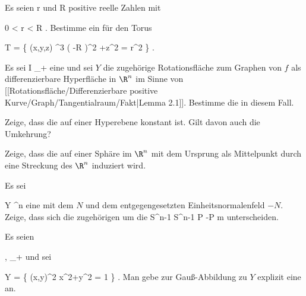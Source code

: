 {}
{

Es seien
\mathkor {} {r} {und} {R} {}
positive reelle Zahlen mit

\mavergleichskette
{\vergleichskette
{ 0
}
{ < }{ r
}
{ < }{ R
}
{    }{
}
{   }{
}
}
{}{}{.}
Bestimme ein
für den
 {} {}
Torus

\mavergleichskettedisp
{\vergleichskette
{ T
}
{ =} { \left\{ (x,y,z) \in \R^3  \mid   \left(   -R  \right)^2 +z^2  = r^2         \right\}
}
{ } {
}
{ } {
}
{ } {
}
}
{}{}{.}

}
{} {}

{}
{

Es sei
 { I } {\R_+
} {}
eine
und sei $Y$ die zugehörige Rotationsfläche zum Graphen von $f$ als differenzierbare Hyperfläche in $\R^n$ im Sinne von
[[Rotationsfläche/Differenzierbare positive Kurve/Graph/Tangentialraum/Fakt|Lemma 2.1]].
Bestimme die
in diesem Fall.

}
{} {}

{}
{

Zeige, dass die
auf einer Hyperebene konstant ist. Gilt davon auch die Umkehrung?

}
{} {}

{}
{

Zeige, dass die
auf einer Sphäre im $\R^n$ mit dem Ursprung als Mittelpunkt durch eine Streckung des $\R^n$ induziert wird.

}
{} {}

{}
{

Es sei

\mavergleichskette
{\vergleichskette
{ Y
}
{ \subseteq }{ \R^n
}
{  }{
}
{    }{
}
{   }{
}
}
{}{}{}
eine
mit dem
$N$ und dem entgegengesetzten Einheitsnormalenfeld $-N$. Zeige, dass sich die zugehörigen
um die
\maabbeledisp {} {S^{n-1}} {S^{n-1}
} { P } { -P
} {m}
unterscheiden.

}
{} {}

{}
{

Es seien

\mavergleichskette
{\vergleichskette
{ \alpha,\beta
}
{ \in }{ \R_+
}
{  }{
}
{    }{
}
{   }{
}
}
{}{}{}
und sei

\mavergleichskettedisp
{\vergleichskette
{ Y
}
{ =} { \left\{ (x,y)\in\R^2  \mid   \alpha x^2+\beta y^2 = 1        \right\}
}
{ } {
}
{ } {
}
{ } {
}
}
{}{}{.}
 { Man gebe zur Gauß-Abbildung zu $Y$ explizit eine
an.
}

}
{} {}

